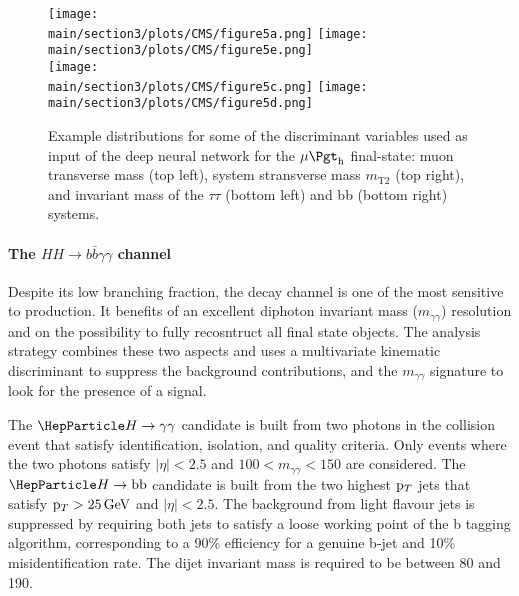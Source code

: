 \begin{figure}[!htb]
\centering 
    \texttt{[image: \\main/section3/plots/CMS/figure5a.png]}
    \texttt{[image: \\main/section3/plots/CMS/figure5e.png]}\\
    \texttt{[image: \\main/section3/plots/CMS/figure5c.png]}
    \texttt{[image: \\main/section3/plots/CMS/figure5d.png]}\\    
\caption{Example distributions for some of the discriminant variables used as input of the \bbtt deep neural network for the $\mu\tauh$ final-state: muon transverse mass (top left), system stransverse mass $m_\text{T2}$ (top right), and invariant mass of the $\tau\tau$ (bottom left) and bb (bottom right) systems.} 
\label{sec3:CMSHH:fig:bbttinputs} 
\end{figure}


\paragraph{The $HH \rightarrow b\bar{b}\gamma\gamma$ channel}

Despite its low branching fraction, the \bbgg decay channel is one of the most sensitive to \HH production.
It benefits of an excellent diphoton invariant mass ($m_{\gamma\gamma}$) resolution and on the possibility to fully recosntruct all final state objects.
The analysis strategy combines these two aspects and uses a multivariate kinematic discriminant to suppress the background contributions, and the $m_{\gamma\gamma}$ signature to look for the presence of a signal.

The $\PH\to\gamma\gamma$ candidate is built from two photons in the collision event that satisfy identification, isolation, and quality criteria.
Only events where the two photons satisfy $|\eta| < 2.5$ and $100 < m_{\gamma\gamma} < 150$ are considered.
The $\PH\to\text{bb}$ candidate is built from the two highest $\mathrm{p}_{T}$ jets that satisfy $\mathrm{p}_{T} > 25\,\text{Ge\hspace{-.08em}V}$ and $|\eta| < 2.5$.
The background from light flavour jets is suppressed by requiring both jets to satisfy a loose working point of the  b tagging algorithm, corresponding to a 90\% efficiency for a genuine b-jet and 10\% misidentification rate.
The dijet invariant mass is required to be between 80 and 190\GeV. 

